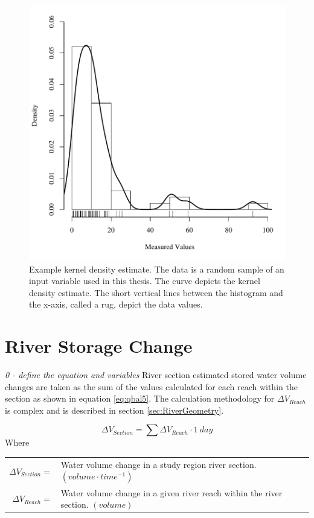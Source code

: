 \begin{linenumbers}
\begin{figure}[htbp]
\begin{center}
	\includegraphics[width=6in]{"Figures/Example KDE"}
	\caption[Example kernel density estimate.]{Example kernel density estimate.  The data is a random sample of an input variable used in this thesis.  The curve depicts the kernel density estimate.  The short vertical lines between the histogram and the x-axis, called a rug, depict the data values.}
	\label{fig:ExampleDistAnalysis}
\end{center}
\end{figure}

\clearpage{}
\section{River Storage Change}
\label{sec:RiverStorageChange}

\emph{0 - define the equation and variables}
River section estimated stored water volume changes are taken as the sum of the values calculated for each reach within the section as shown in equation \ref{eq:qbal5}.  The calculation methodology for $\Delta V_{Reach}$ is complex and is described in section \ref{sec:RiverGeometry}.

\begin{equation}
	\Delta V_{Section} = \sum \Delta V_{Reach} \cdot 1~day
	\label{eq:qbal5}
\end{equation}
Where\\
\begin{tabular}{rl}
$\Delta V_{Section} =$& Water volume change in a study region river section.  $(volume \cdot time^{-1})$\\
$\Delta V_{Reach} =$& Water volume change in a given river reach within the river section.  $(volume)$\\
\end{tabular}\\


\end{linenumbers}
